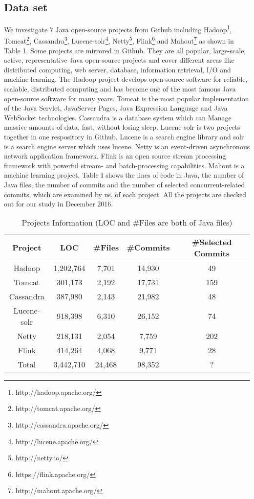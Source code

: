 \subsection{Data set}
\label{sec:method:data}
We investigate 7 Java open-source projects from Github including Hadoop\footnote{http://hadoop.apache.org/}, Tomcat\footnote{http://tomcat.apache.org/}, Cassandra\footnote{http://cassandra.apache.org/}, Lucene-solr\footnote{http://lucene.apache.org/}, Netty\footnote{http://netty.io/}, Flink\footnote{https://flink.apache.org/} and Mahout\footnote{http://mahout.apache.org/} as shown in Table 1. Some projects are mirrored in Github. They are all popular, large-scale, active, representative Java open-source projects and cover different areas like distributed computing, web server, database, information retrieval, I/O and machine learning. The Hadoop project develops open-source software for reliable, scalable, distributed computing and has become one of the most famous Java open-source software for many years. Tomcat is the most popular implementation of the Java Servlet, JavaServer Pages, Java Expression Language and Java WebSocket technologies. Cassandra \cite{journals/sigops/LakshmanM10} is a database system which can Manage massive amounts of data, fast, without losing sleep. Lucene-solr is two projects together in one respository in Github. Lucene is a search engine library and solr is a search engine server which uses lucene. Netty is an event-driven asynchronous network application framework. Flink is an open source stream processing framework with powerful stream- and batch-processing capabilities. Mahout is a machine learning project. Table I shows the lines of code in Java, the number of Java files, the number of commits and the number of selected concurrent-related commits, which are examined by us, of each project. All the projects are checked out for our study in December 2016.

\begin{table}
	\centering
	\caption{Projects Information (LOC and \#Files are both of Java files)}
	\begin{tabular}{|c|c|c|c|c|}\hline
		Project&LOC&\#Files&\#Commits&\#Selected Commits\\\hline
		Hadoop&1,202,764&7,701&14,930&49\\
		Tomcat&301,173&2,192&17,731&159\\
		Cassandra&387,980&2,143&21,982&48\\
		Lucene-solr&918,398&6,310&26,152&74\\
		Netty&218,131&2,054&7,759&202\\
		Flink&414,264&4,068&9,771&28\\\hline
		Total&3,442,710&24,468&98,352&?\\\hline
	\end{tabular}
\end{table}

